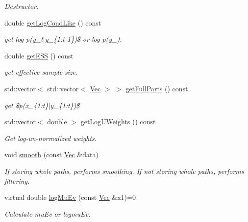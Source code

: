 \begin{DoxyCompactItemize}
\begin{DoxyCompactList}\small\item\em Destructor. \end{DoxyCompactList}\item 
double \hyperlink{classSISRSmoother_a6316bfec4e62d522e1fe32f8c4b18b0f}{get\+Log\+Cond\+Like} () const 
\begin{DoxyCompactList}\small\item\em get log p(y\+\_\+t$\vert$y\+\_\+\{1\+:t-\/1\})\$ or log p(y\+\_). \end{DoxyCompactList}\item 
double \hyperlink{classSISRSmoother_a9e6a9e4681075c1ea28a7476b261e1fc}{get\+E\+SS} () const 
\begin{DoxyCompactList}\small\item\em get effective sample size. \end{DoxyCompactList}\item 
std\+::vector$<$ std\+::vector$<$ \hyperlink{apf__filter_8h_a4c7df05c6f5e8a0d15ae14bcdbc07152}{Vec} $>$ $>$ \hyperlink{classSISRSmoother_a52ba9c6f180491ed1751772bb832c5ac}{get\+Full\+Parts} () const 
\begin{DoxyCompactList}\small\item\em get \$p(x\+\_\+\{1\+:t\}$\vert$y\+\_\+\{1\+:t\})\$ \end{DoxyCompactList}\item 
std\+::vector$<$ double $>$ \hyperlink{classSISRSmoother_af7ede0870c83af1e4accfa70675b21bc}{get\+Log\+U\+Weights} () const 
\begin{DoxyCompactList}\small\item\em Get log-\/un-\/normalized weights. \end{DoxyCompactList}\item 
void \hyperlink{classSISRSmoother_a11193002ca13b8186167f7c3f6db625c}{smooth} (const \hyperlink{apf__filter_8h_a4c7df05c6f5e8a0d15ae14bcdbc07152}{Vec} \&data)
\begin{DoxyCompactList}\small\item\em If storing whole paths, performs smoothing. If not storing whole paths, performs filtering. \end{DoxyCompactList}\item 
virtual double \hyperlink{classSISRSmoother_a5498af2a7a572435f303a2238c252464}{log\+Mu\+Ev} (const \hyperlink{apf__filter_8h_a4c7df05c6f5e8a0d15ae14bcdbc07152}{Vec} \&x1)=0
\begin{DoxyCompactList}\small\item\em Calculate mu\+Ev or logmu\+Ev. \end{DoxyCompactList}\item 

\end{DoxyCompactItemize}
